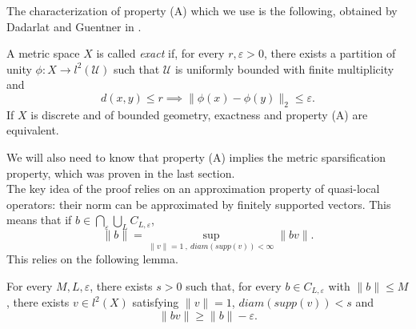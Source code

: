 The characterization of property (A) which we use is the following, obtained by Dadarlat and Guentner in \cite{dadarlat2007uniform}.

\begin{thm} 
A metric space $X$ is called \textit{exact} if, for every $r,\varepsilon>0$, there exists a partition of unity $\phi: X \rightarrow l^2(\mathcal U)$ such that $\mathcal U $ is uniformly bounded with finite multiplicity and 
\[d(x,y)\leq r \implies \| \phi(x) - \phi(y) \|_{2} \leq \varepsilon.\]
If $X$ is discrete and of bounded geometry, exactness and property (A) are equivalent.
\end{thm} 

We will also need to know that property (A) implies the metric sparsification property, which was proven in the last section.\\

The key idea of the proof relies on an approximation property of quasi-local operators: their norm can be approximated by finitely supported vectors. This means that if $b\in \bigcap_\varepsilon \bigcup_L C_{L,\varepsilon}$,
\[\| b \| = \sup_{\|v \| =1 \ , \ diam( supp(v))<\infty} \|bv\|. \]
This relies on the following lemma.

\begin{lem}
For every $M,L,\varepsilon$, there exists $s>0$ such that, for every $b\in C_{L,\varepsilon}$ with $\| b \| \leq M$, there exists $v\in l^2(X)$ satisfying $\|v\| = 1$, $diam(supp(v)) <s$ and 
\[\| b v\| \geq \| b\| -\varepsilon.\] 
\end{lem}

